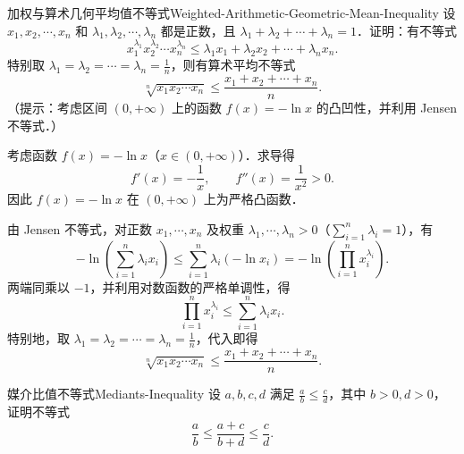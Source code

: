 \begin{problem}{加权与算术几何平均值不等式}{Weighted-Arithmetic-Geometric-Mean-Inequality}
    设 $x_1, x_2, \cdots, x_n$ 和 $\lambda_1, \lambda_2, \cdots, \lambda_n$ 都是正数，且 $\lambda_1 + \lambda_2 + \cdots + \lambda_n = 1$．证明：有不等式
    \begin{equation}
        x_1^{\lambda_1} x_2^{\lambda_2} \cdots x_n^{\lambda_n} \leqslant \lambda_1 x_1 + \lambda_2 x_2 + \cdots + \lambda_n x_n.
    \end{equation}
    特别取 $\lambda_1 = \lambda_2 = \cdots = \lambda_n = \frac{1}{n}$，则有算术平均不等式
    \begin{equation}
        \sqrt[n]{x_1 x_2 \cdots x_n} \leqslant \frac{x_1 + x_2 + \cdots + x_n}{n}.
    \end{equation}
    （提示：考虑区间 $(0, +\infty)$ 上的函数 $f(x) = -\ln x$ 的凸凹性，并利用 Jensen 不等式．）
\end{problem}

\begin{myproof}
    考虑函数 $f(x) = -\ln x$（$x \in (0, +\infty)$）．求导得
    \begin{equation}
        f'(x) = -\frac{1}{x}, \qquad f''(x) = \frac{1}{x^2} > 0.
    \end{equation}
    因此 $f(x) = -\ln x$ 在 $(0, +\infty)$ 上为严格凸函数．

    由 Jensen 不等式，对正数 $x_1, \cdots, x_n$ 及权重 $\lambda_1, \cdots, \lambda_n > 0$（$\sum_{i=1}^n \lambda_i = 1$），有
    \begin{equation}
        -\ln\left( \sum_{i=1}^n \lambda_i x_i \right) \leqslant \sum_{i=1}^n \lambda_i (-\ln x_i) = -\ln\left( \prod_{i=1}^n x_i^{\lambda_i} \right).
    \end{equation}
    两端同乘以 $-1$，并利用对数函数的严格单调性，得
    \begin{equation}
        \prod_{i=1}^n x_i^{\lambda_i} \leqslant \sum_{i=1}^n \lambda_i x_i.
    \end{equation}
    特别地，取 $\lambda_1 = \lambda_2 = \cdots = \lambda_n = \frac{1}{n}$，代入即得
    \begin{equation}
        \sqrt[n]{x_1 x_2 \cdots x_n} \leqslant \frac{x_1 + x_2 + \cdots + x_n}{n}.
    \end{equation}
\end{myproof}

\begin{problem}{媒介比值不等式}{Mediants-Inequality}
    设 $a, b, c, d$ 满足 $\frac{a}{b} \leqslant \frac{c}{d}$，其中 $b > 0, d > 0$，证明不等式
    \begin{equation}
        \frac{a}{b} \leqslant \frac{a+c}{b+d} \leqslant \frac{c}{d}.
    \end{equation}
\end{problem}


